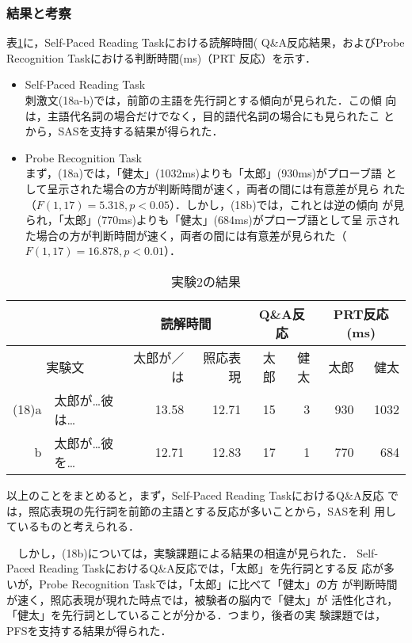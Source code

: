 \subsubsection{結果と考察}
  表\ref{table:exam2ar}に，Self-Paced Reading Taskにおける読解時間(
  Q\&A反応結果，およびProbe Recognition Taskにおける判断時間(ms)（PRT
  反応）を示す．

\begin{itemize}
  \item Self-Paced Reading Task\\
    刺激文(18a-b)では，前節の主語を先行詞とする傾向が見られた．この傾
    向は，主語代名詞の場合だけでなく，目的語代名詞の場合にも見られたこ
    とから，SASを支持する結果が得られた．
　\item Probe Recognition Task\\
    まず，(18a)では，「健太」(1032ms)よりも「太郎」(930ms)がプローブ語
    として呈示された場合の方が判断時間が速く，両者の間には有意差が見ら
    れた（$F(1,17)=5.318, p<0.05$）．しかし，(18b)では，これとは逆の傾向
    が見られ，「太郎」(770ms)よりも「健太」(684ms)がプローブ語として呈
    示された場合の方が判断時間が速く，両者の間には有意差が見られた（$F
    (1,17)=16.878, p<0.01$）．
\end{itemize}

\begin{table}
\begin{center}
\caption{実験2の結果}
\label{table:exam2ar}
\begin{tabular}{|rl|r|r|r|r|r|r|} \hline
 \multicolumn{2}{|c|}{}&
 \multicolumn{2}{c|}{読解時間} &
 \multicolumn{2}{c|}{Q\&A反応} &
 \multicolumn{2}{c|}{PRT反応(ms)} \\ \hline
 \multicolumn{2}{|c|}{実験文} & 
  太郎が／は & 照応表現 & 太郎 & 健太 & 太郎 & 健太 \\ \hline
 (18)a & 太郎が\ldots 彼は\ldots & 13.58 & 12.71 & 15 & 3 & 930 & 1032\\
     b & 太郎が\ldots 彼を\ldots & 12.71 & 12.83 & 17 & 1 & 770 &
 684 \\ \hline
\end{tabular}
\end{center}
\end{table}

  以上のことをまとめると，まず，Self-Paced Reading TaskにおけるQ\&A反応
  では，照応表現の先行詞を前節の主語とする反応が多いことから，SASを利
  用しているものと考えられる．

  　しかし，(18b)については，実験課題による結果の相違が見られた．
  Self-Paced Reading TaskにおけるQ\&A反応では，「太郎」を先行詞とする反
  応が多いが，Probe Recognition Taskでは，「太郎」に比べて「健太」の方
  が判断時間が速く，照応表現が現れた時点では，被験者の脳内で「健太」が
  活性化され，「健太」を先行詞としていることが分かる．つまり，後者の実
  験課題では，PFSを支持する結果が得られた．

